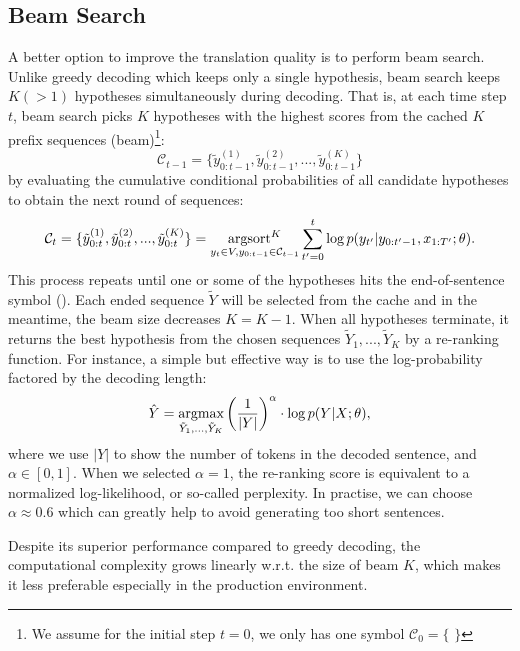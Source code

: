 \subsection{Beam Search}  
A better option to improve the translation quality is to perform beam search.
Unlike greedy decoding which keeps only a single hypothesis, beam search keeps $K (>1)$ hypotheses simultaneously during decoding. 
That is, at each time step $t$, beam search picks $K$ hypotheses with the highest scores from the cached $K$ prefix sequences (beam)\footnote{We assume for the initial step $t=0$, we only has one symbol $\mathcal{C}_0 = \{$ \bos $\}$}:
\begin{equation}
    \mathcal{C}_{t-1} = \{\tilde{y}_{0:t-1}^{(1)}, \tilde{y}_{0:t-1}^{(2)}, ..., \tilde{y}_{0:t-1}^{(K)} \}
\end{equation}
by evaluating the cumulative conditional probabilities of all candidate hypotheses to obtain the next round of sequences: 
\begin{equation}
     \mathcal{C}_{t} = \{\tilde{y}_{0:t}^{(1)}, \tilde{y}_{0:t}^{(2)}, ..., \tilde{y}_{0:t}^{(K)} \} =
     \mathop{\operatorname{\text{argsort}}^K}\limits_{y_t\in V, \\  y_{0:t-1}\in \mathcal{C}_{t-1}} \sum_{t'=0}^t\log p(y_{t'}|y_{0:t'-1}, x_{1:T'}; \theta).
\end{equation}
This process repeats until one or some of the hypotheses hits the end-of-sentence symbol (\eos). Each ended sequence $\tilde{Y}$ will be selected from the cache and in the meantime, the beam size decreases $K = K - 1$.
When all hypotheses terminate, it returns the best hypothesis from the chosen sequences $\tilde{Y}_1, ..., \tilde{Y}_K$ by a re-ranking function. For instance, a simple but effective way is to use the log-probability factored by the decoding length:
\begin{equation}
    \hat{Y} = \mathop{\text{argmax}}_{\tilde{Y}_1, ..., \tilde{Y}_K} \left(\frac{1}{|Y|}\right)^\alpha\cdot\log p(Y|X; \theta),
\end{equation}
where we use $|Y|$ to show the number of tokens in the decoded sentence, and $\alpha \in [0, 1]$. When we selected $\alpha=1$, the re-ranking score is equivalent to a normalized log-likelihood, or so-called perplexity. In practise, we can choose $\alpha \approx 0.6$ which can greatly help to avoid generating too short sentences.

Despite its superior performance compared to greedy decoding, the computational complexity grows linearly w.r.t. the size of beam $K$, which makes it less preferable especially in the production environment.


